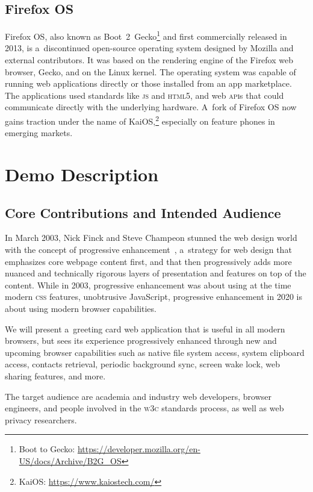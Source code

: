 \documentclass[sigconf]{acmart}
\begin{document}
\subsection{Firefox \textsc{OS}}

Firefox \textsc{OS}, also known as
Boot~2~Gecko\footnote{Boot to Gecko: \url{https://developer.mozilla.org/en-US/docs/Archive/B2G_OS}}
and first commercially released in 2013,
is a~discontinued open-source operating system
designed by Mozilla and external contributors.
It was based on the rendering engine of the Firefox web browser, Gecko,
and on the Linux kernel.
The operating system was capable of running web applications directly
or those installed from an app marketplace.
The applications used standards like \textsc{js} and \textsc{html}5,
and web \textsc{api}s that could communicate directly with the underlying hardware.
A~fork of Firefox \textsc{OS} now gains traction under the name of
Kai\textsc{OS},\footnote{Kai\textsc{OS}: \url{https://www.kaiostech.com/}}
especially on feature phones in emerging markets.

\section{Demo Description}

\subsection{Core Contributions and Intended Audience}

In March 2003, Nick Finck and Steve Champeon stunned the web design world
with the concept of progressive enhancement~\cite{champeon03},
a~strategy for web design that emphasizes core webpage content first,
and that then progressively adds more nuanced and technically rigorous layers
of presentation and features on top of the content.
While in 2003, progressive enhancement was about using at the time modern \textsc{css} features,
unobtrusive JavaScript, progressive enhancement in 2020 is about using modern browser capabilities.

We will present a~greeting card web application that is useful in all modern browsers,
but sees its experience progressively enhanced through new and upcoming browser capabilities
such as native file system access, system clipboard access, contacts retrieval,
periodic background sync, screen wake lock, web sharing features, and more.

The target audience are academia and industry web developers, browser engineers,
and people involved in the \textsc{w3c} standards process,
as well as web privacy researchers.
\end{document}
